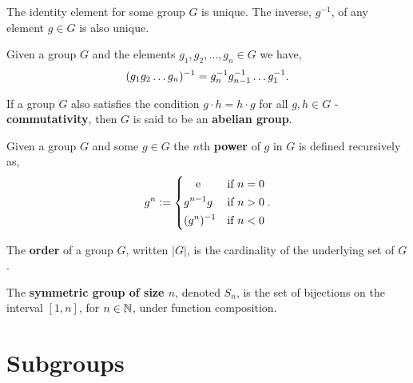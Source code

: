 \begin{theorem}[Uniqueness]
    The identity element for some group $G$ is unique. The inverse, $g^{-1}$, of any element $g\in G$ is also unique.
\end{theorem}

\begingroup\belowdisplayskip=-10pt
\begin{lemma}
    Given a group $G$ and the elements $g_1,g_2,\ldots,g_n\in G$ we have, \[
        (g_1g_2\dots g_n)^{-1} = g_n^{-1}g_{n-1}^{-1}\dots g_1^{-1}
        \textcolor{black}{.}
    \]
\end{lemma}
\endgroup

\begin{definition}
    If a group $G$ also satisfies the condition $g\cdot h = h\cdot g$ for all $g,h\in G$ - \textbf{commutativity}, then $G$ is said to be an \textbf{abelian group}.
\end{definition}

\begingroup\belowdisplayskip=-10pt
\begin{definition}
    Given a group $G$ and some $g\in G$ the $n$th \textbf{power} of $g$ in $G$ is defined recursively as, \[
        g^n:= \begin{dcases}
            \omit\hfil e  \hfil & \text{\textcolor{black}{if }} n=0 \\
            g^{n-1}g & \text{\textcolor{black}{if }} n>0 \\
            (g^{n})^{-1} & \text{\textcolor{black}{if }} n<0 \\
        \end{dcases}
    \textcolor{black}{.}
    \]
\end{definition}
\endgroup

\begin{definition}
    The \textbf{order} of a group $G$, written $|G|$, is the cardinality of the underlying set of $G$.
\end{definition}

\begin{example}
    The \textbf{symmetric group of size $n$}, denoted $S_n$, is the set of bijections on the interval $[1,n]$, for $n\in\mathbb{N}$, under function composition.
\end{example}

\section{Subgroups}

